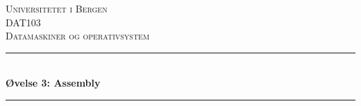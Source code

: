 \documentclass[norsk, a4paper, 12pt,]{article}
\begin{document}
\begin{titlepage}


\newcommand{\HRule}{\rule{\linewidth}{0.5mm}} %

\center %


\textsc{\LARGE Universitetet i Bergen}\\[1.5cm] %
\textsc{\Large DAT103}\\[0.5cm] %
\textsc{\large Datamaskiner og operativsystem}\\[0.5cm] %


\HRule \\[0.4cm]
{ \huge \bfseries Øvelse 3: Assembly}\\[0.4cm] %
\HRule \\[1.5cm]


\end{titlepage}
\end{document}

